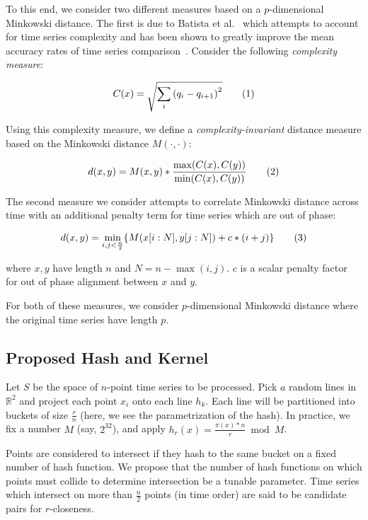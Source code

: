 \documentclass[a4paper]{article}
\newcommand\numberthis{\addtocounter{equation}{1}\tag{\theequation}}
\theoremstyle{def}
\theoremstyle{thm}
\newcommand{\R}[0]{\mathbb{R}}
\begin{document}
To this end, we consider two different measures based on a $p$-dimensional Minkowski distance.
The first is due to Batista et al.~\cite{batista14-cid} which attempts to account for time series complexity and has been shown to greatly improve the mean accuracy rates of time series comparison~\cite{giusti13-ecd}.
Consider the following \textit{complexity measure}:

\begin{align*}
    C(x) = \sqrt{\sum\limits_i {(q_i - q_{i+1})}^2} \numberthis
\end{align*}

Using this complexity measure, we define a \textit{complexity-invariant} distance measure based on the Minkowski distance $M(\cdot,\cdot)$:

\begin{align*}
    d(x,y) = M(x,y) * \frac{\max(C(x),C(y))}{\min(C(x),C(y))} \numberthis
\end{align*}

The second measure we consider attempts to correlate Minkowski distance across time with an additional penalty term for time series which are out of phase:

\begin{align*}
    d(x,y) = \min\limits_{i,j<\frac{n}{2}} \{ M(x[i:N],y[j:N]) + c*(i+j) \} \numberthis \\
\end{align*}

where $x,y$ have length $n$ and $N = n - \max(i,j)$.
$c$ is a scalar penalty factor for out of phase alignment between $x$ and $y$.

For both of these measures, we consider $p$-dimensional Minkowski distance where the original time series have length $p$.

\fi

\subsection{Proposed Hash and Kernel}
\label{subsec:proposed_kernel}

Let $S$ be the space of $n$-point time series to be processed.
Pick $a$ random lines in $\R^2$ and project each point $x_i$ onto each line $h_k$.
Each line will be partitioned into buckets of size $\frac{r}{n}$ (here, we see the parametrization of the hash).
In practice, we fix a number $M$ (say, $2^{32}$), and apply $h_r(x) = \frac{\pi(x)*n}{r} \bmod M$. 

Points are considered to intersect if they hash to the same bucket on a fixed number of hash function.
We propose that the number of hash functions on which points must collide to determine intersection be a tunable parameter.
Time series which intersect on more than $\frac{n}{2}$ points (in time order) are said to be candidate pairs for $r$-closeness.
\end{document}
